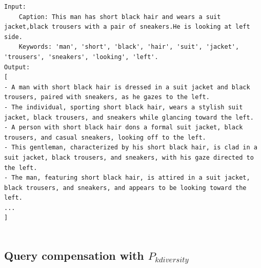 \begin{minipage}[t]{0.48\textwidth}
\begin{tcolorbox}[
  title=Example,
  colback=lightgray,
  colframe=gray!70,
  fonttitle=\bfseries,
  boxrule=0.5pt,
  arc=3pt,
  top=1mm, bottom=1mm, left=1mm, right=1mm,
  sharp corners,
]

\lstset{
  basicstyle=\ttfamily,    
  breaklines=true,              
  breakatwhitespace=true,      
  columns=fullflexible,
  keepspaces=true
}

\footnotesize

\begin{lstlisting}[language=Prompt]
Input:
    Caption: This man has short black hair and wears a suit jacket,black trousers with a pair of sneakers.He is looking at left side.
    Keywords: 'man', 'short', 'black', 'hair', 'suit', 'jacket', 'trousers', 'sneakers', 'looking', 'left'.
Output:
[
- A man with short black hair is dressed in a suit jacket and black trousers, paired with sneakers, as he gazes to the left.
- The individual, sporting short black hair, wears a stylish suit jacket, black trousers, and sneakers while glancing toward the left.
- A person with short black hair dons a formal suit jacket, black trousers, and casual sneakers, looking off to the left.
- This gentleman, characterized by his short black hair, is clad in a suit jacket, black trousers, and sneakers, with his gaze directed to the left.
- The man, featuring short black hair, is attired in a suit jacket, black trousers, and sneakers, and appears to be looking toward the left.
...
]
    

\end{lstlisting}

\end{tcolorbox}
\end{minipage}


\subsection{Query compensation with $P_{kdiversity}$}

